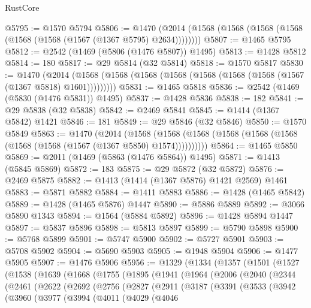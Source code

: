 \begin{lexlean}{RustCore}
\begin{coremodule}
{\begin{coremodule}
{{{{{{{{{{{{{{{{{{{{{{{{{{{{{{{{{{{{{{{{{{{{{{{@5795 := @1570 @5794
@5806 := @1470 (@2014 (@1568 (@1568 (@1568 (@1568 (@1568 (@1568 (@1567 (@1367 @5795) @2634))))))))
@5807 := @1465 @5795
@5812 := @2542 (@1469 (@5806 (@1476 @5807)) @1495)
@5813 := @1428 @5812
@5814 := 180
@5817 := @29 @5814 (@32 @5814)
@5818 := @1570 @5817
@5830 := @1470
    (@2014 (@1568 (@1568 (@1568 (@1568 (@1568 (@1568 (@1568 (@1567 (@1367 @5818) @1601)))))))))
@5831 := @1465 @5818
@5836 := @2542 (@1469 (@5830 (@1476 @5831)) @1495)
@5837 := @1428 @5836
@5838 := 182
@5841 := @29 @5838 (@32 @5838)
@5842 := @2469 @5841
@5845 := @1414 (@1367 @5842) @1421
@5846 := 181
@5849 := @29 @5846 (@32 @5846)
@5850 := @1570 @5849
@5863 := @1470
    (@2014
      (@1568 (@1568 (@1568 (@1568 (@1568 (@1568 (@1568 (@1568 (@1567 (@1367 @5850) @1574))))))))))
@5864 := @1465 @5850
@5869 := @2011 (@1469 (@5863 (@1476 @5864)) @1495)
@5871 := @1413 (@5845 @5869)
@5872 := 183
@5875 := @29 @5872 (@32 @5872)
@5876 := @2469 @5875
@5882 := @1413 (@1414 (@1367 @5876) @1421 @2569) @1461
@5883 := @5871 @5882
@5884 := @1411 @5883
@5886 := @1428 (@1465 @5842)
@5889 := @1428 (@1465 @5876) @1447
@5890 := @5886 @5889
@5892 := @3066 @5890 @1343
@5894 := @1564 (@5884 @5892)
@5896 := @1428 @5894 @1447
@5897 := @5837 @5896
@5898 := @5813 @5897
@5899 := @5790 @5898
@5900 := @5768 @5899
@5901 := @5747 @5900
@5902 := @5727 @5901
@5903 := @5708 @5902
@5904 := @5690 @5903
@5905 := @1948 @5904
@5906 := @1477 @5905
@5907 := @1476 @5906
@5956 := @1329
    (@1334
      (@1357
        (@1501
          (@1527
            (@1538
              (@1639
                (@1668
                  (@1755
                    (@1895
                      (@1941
                        (@1964
                          (@2006
                            (@2040
                              (@2344
                                (@2461
                                  (@2622
                                    (@2692
                                      (@2756
                                        (@2827
                                          (@2911
                                            (@3187
                                              (@3391
                                                (@3533
                                                  (@3942
                                                    (@3960
                                                      (@3977
                                                        (@3994
                                                          (@4011
                                                            (@4029
                                                              (@4046
}}}}}}}}}}}}}}}}}}}}}}}}}}}}}}}}}}}}}}}}}}}}}}}
\end{coremodule}}
\end{coremodule}
\end{lexlean}
